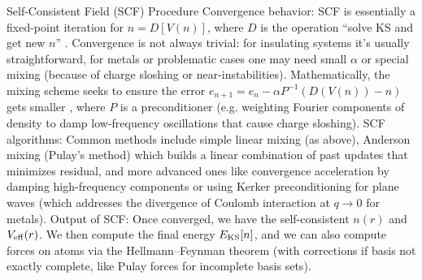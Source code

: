 \begin{frame}{Self-Consistent Field (SCF) Procedure}
Convergence behavior: SCF is essentially a fixed-point iteration for $n = D[V(n)]$, where $D$ is the operation “solve KS and get new $n$” . Convergence is not always trivial: for insulating systems it’s usually straightforward, for metals or problematic cases one may need small $\alpha$ or special mixing (because of charge sloshing or near-instabilities). Mathematically, the mixing scheme seeks to ensure the error $e_{n+1} = e_n - \alpha P^{-1}(D(V(n)) - n)$ gets smaller  , where $P$ is a preconditioner (e.g. weighting Fourier components of density to damp low-frequency oscillations that cause charge sloshing).
SCF algorithms: Common methods include simple linear mixing (as above), Anderson mixing (Pulay’s method) which builds a linear combination of past updates that minimizes residual, and more advanced ones like convergence acceleration by damping high-frequency components or using Kerker preconditioning for plane waves (which addresses the divergence of Coulomb interaction at $q\to0$ for metals).
Output of SCF: Once converged, we have the self-consistent $n(r)$ and $V_{\rm eff}(r)$. We then compute the final energy $E_{\rm KS}[n]$, and we can also compute forces on atoms via the Hellmann–Feynman theorem (with corrections if basis not exactly complete, like Pulay forces for incomplete basis sets). \end{frame}


